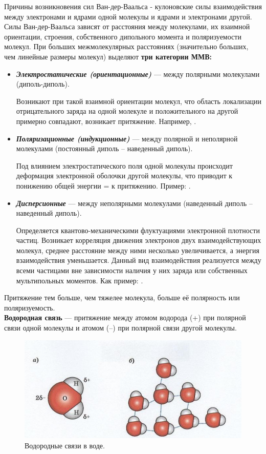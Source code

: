 Причины возникновения сил Ван-дер-Ваальса - кулоновские силы взаимодействия между электронами и ядрами одной молекулы и ядрами и электронами другой. Силы Ван-дер-Ваальса зависят от расстояния между молекулами, их взаимной ориентации, строения, собственного дипольного момента и поляризуемости молекул. При больших межмолекулярных расстояниях (значительно больших, чем линейные размеры молекул) выделяют \textbf{три категории ММВ:}
\begin{itemize}
	\item \textbf{\textit{Электростатические (ориентационные)}} --- между полярными молекулами (диполь-диполь). 
	
	Возникают при такой взаимной ориентации молекул, что область локализации отрицательного заряда на одной молекуле и положительного на другой примерно совпадают, возникает притяжение. Например, .
	
	\item \textbf{\textit{Поляризационные (индукционные)}} --- между полярной и неполярной молекулами (постоянный диполь -- наведенный диполь).
	
	Под влиянием электростатического поля одной молекулы происходит деформация электронной оболочки другой молекулы, что приводит к понижению общей энергии = к притяжению. Пример: .
	
	\item \textbf{\textit{Дисперсионные}} --- между неполярными молекулами (наведенный диполь -- наведенный диполь).
	
	Определяется квантово-механическими флуктуациями электронной плотности частиц. Возникает корреляция движения электронов двух взаимодействующих молекул, среднее расстояние между ними несколько увеличивается, а энергия взаимодействия уменьшается. Данный вид взаимодействия реализуется между всеми частицами вне зависимости наличия у них заряда или собственных мультипольных моментов. Как пример: .
\end{itemize}

Притяжение тем больше, чем тяжелее молекула, больше её полярность или поляризуемость.\\

\textbf{Водородная связь} --- притяжение между атомом водорода (+) при полярной связи одной молекулы и атомом  (–) при полярной связи другой молекулы.

\begin{figure}[H]
	\centering
	\includegraphics{Pictures/Vodorod.jpg}
	\caption{Водородные связи в воде.}
\end{figure}

